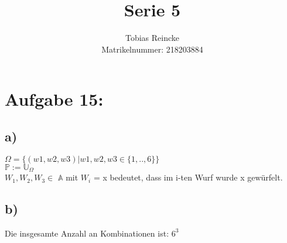 \documentclass[11pt]{article} %
\title{\color{blue} Serie 5 }
\author{Tobias Reincke\\ Matrikelnummer: 218203884 \\}
\begin{document}
	
\maketitle
\section*{\textbf Aufgabe 15:}
\subsection*{a)} $\Omega = \{(w1,w2,w3)| w1,w2,w3 \in \{1,..,6\}\}$ \\ $\mathbb{P} := \mathbb{U}_{\Omega}$\\ 
 $W_1,W_2,W_3 \in$ $\mathbb{A}$ mit  $W_i$ = x bedeutet, dass im i-ten Wurf wurde x gewürfelt.  
\subsection*{b)}
Die insgesamte Anzahl an Kombinationen ist: $6^3$
\end{document}
